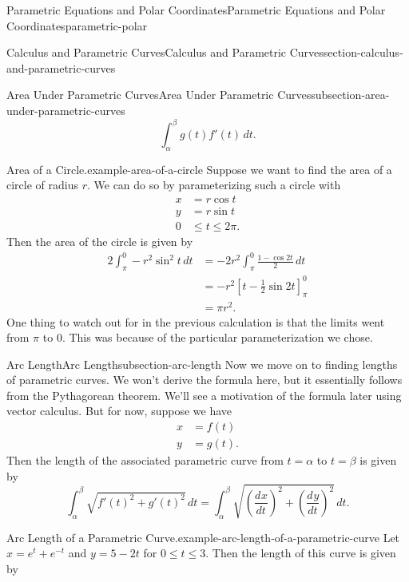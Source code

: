 \documentclass[oneside,10pt,]{book}
\numberwithin{equation}{section}
\newcommand{\dv}[3][]{\dfrac{d^{#1} #2}{d #3^{#1}}}
\newcommand{\amp}{&}
\begin{document}
\begin{chapterptx}{Parametric Equations and Polar Coordinates}{}{Parametric Equations and Polar Coordinates}{}{}{parametric-polar}
\begin{sectionptx}{Calculus and Parametric Curves}{}{Calculus and Parametric Curves}{}{}{section-calculus-and-parametric-curves}
\begin{subsectionptx}{Area Under Parametric Curves}{}{Area Under Parametric Curves}{}{}{subsection-area-under-parametric-curves}
\begin{equation*}
\int_{\alpha}^{\beta}g(t)f'(t)\,dt.
\end{equation*}
%
\begin{example}{Area of a Circle.}{example-area-of-a-circle}%
\hypertarget{p-1008}{}%
Suppose we want to find the area of a circle of radius \(r\). We can do so by parameterizing such a circle with%
%
\begin{align*}
x \amp = r\cos t \\
y \amp = r\sin t \\
0 \amp \leq t\leq 2\pi. 
\end{align*}
\hypertarget{p-1009}{}%
Then the area of the circle is given by%
\begin{align*}
2\int_{\pi}^{0} -r^{2}\sin^{2}t\,dt \amp= -2r^{2}\int_{\pi}^{0}\frac{1-\cos2t}{2}\,dt\\
\amp = -r^{2}\left[t-\frac{1}{2}\sin2t\right]_{\pi}^{0} \\
\amp = \pi r^{2}.
\end{align*}
One thing to watch out for in the previous calculation is that the limits went from \(\pi\) to \(0\). This was because of the particular parameterization we chose.%
\end{example}
\end{subsectionptx}
%
%
\typeout{************************************************}
\typeout{************************************************}
%
\begin{subsectionptx}{Arc Length}{}{Arc Length}{}{}{subsection-arc-length}
\hypertarget{p-1010}{}%
Now we move on to finding lengths of parametric curves. We won't derive the formula here, but it essentially follows from the Pythagorean theorem. We'll see a motivation of the formula later using vector calculus. But for now, suppose we have%
%
\begin{align*}
x \amp = f(t) \\
y \amp = g(t). 
\end{align*}
\hypertarget{p-1011}{}%
Then the length of the associated parametric curve from \(t=\alpha\) to \(t=\beta\) is given by%
%
\begin{equation*}
\int_{\alpha}^{\beta} \sqrt{f'(t)^{2}+g'(t)^{2}}\,dt = \int_{\alpha}^{\beta}\sqrt{\left(\dv{x}{t}\right)^{2} + \left(\dv{y}{t}\right)^{2}}\,dt.
\end{equation*}
\begin{example}{Arc Length of a Parametric Curve.}{example-arc-length-of-a-parametric-curve}%
\hypertarget{p-1012}{}%
Let \(x = e^{t}+e^{-t}\) and \(y = 5-2t\) for \(0\leq t\leq 3.\) Then the length of this curve is given by%

\end{example}
\end{subsectionptx}
\end{sectionptx}
\end{chapterptx}
\end{document}
